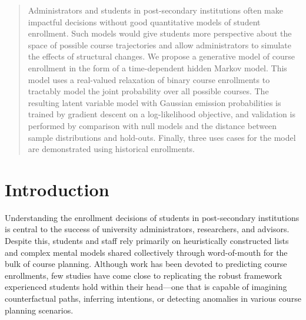 \documentclass{edm_template}
\begin{document}
\maketitle
\begin{abstract}
Administrators and students in post-secondary institutions often make impactful decisions without good quantitative models of student enrollment. Such models would give students more perspective about the space of possible course trajectories and allow administrators to simulate the effects of structural changes. We propose a generative model of course enrollment in the form of a time-dependent hidden Markov model. This model uses a real-valued relaxation of binary course enrollments to tractably model the joint probability over all possible courses. The resulting latent variable model with Gaussian emission probabilities is trained by gradient descent on a log-likelihood objective, and validation is performed by comparison with null models and the distance between sample distributions and hold-outs. Finally, three uses cases for the model are demonstrated using historical enrollments. 
\end{abstract}

%


\section{Introduction}

Understanding the enrollment decisions of students in post-secondary institutions is central to the success of university administrators, researchers, and advisors. Despite this, students and staff rely primarily on heuristically constructed lists and complex mental models shared collectively through word-of-mouth for the bulk of course planning. Although work has been devoted to predicting course enrollments, few studies have come close to replicating the robust framework experienced students hold within their head---one that is capable of imagining counterfactual paths, inferring intentions, or detecting anomalies in various course planning scenarios.
\end{document}
